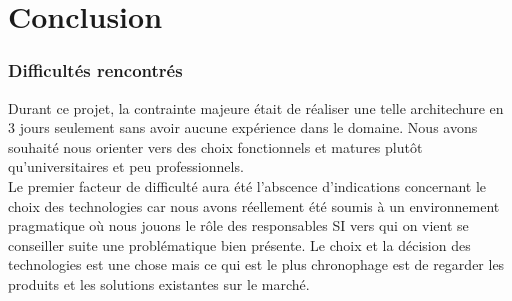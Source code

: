 \documentclass[11pt,a4paper]{report}
\begin{document}
                    
    \part{Conclusion}
        \section{Difficult\'es rencontr\'es}
            
            Durant ce projet, la contrainte majeure \'etait de r\'ealiser une telle architechure en 3 jours seulement sans avoir aucune exp\'erience dans le domaine. Nous avons souhait\'e nous orienter vers des choix fonctionnels et matures plut\^ot qu'universitaires et peu professionnels.\\
            
            Le premier facteur de difficult\'e aura \'et\'e l'abscence d'indications concernant le choix des technologies car nous avons r\'eellement \'et\'e soumis \`a un environnement pragmatique o\`u nous jouons le r\^ole des responsables SI vers qui on vient se conseiller suite une probl\'ematique bien pr\'esente.
            Le choix et la d\'ecision des technologies est une chose mais ce qui est le plus chronophage est de regarder les produits et les solutions existantes sur le march\'e.\\
            
\end{document}
